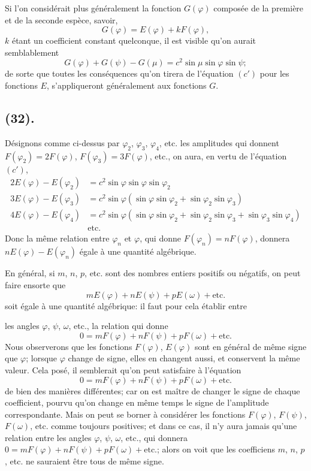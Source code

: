 \documentclass{article}
\begin{document}
Si l'on considérait plus généralement la fonction $G(\varphi)$ composée de la première et de la seconde espèce, savoir,
\[ G(\varphi)=E(\varphi)+kF(\varphi), \]
$k$ étant un coefficient constant quelconque, il est visible qu'on aurait semblablement
\[ G(\varphi)+G(\psi)-G(\mu)=c^{2}\sin\mu\sin\varphi\sin\psi; \]
de sorte que toutes les conséquences qu'on tirera de l'équation $(c')$ pour les fonctions $E$, s'appliqueront généralement aux fonctions $G$.

\subsection*{(32).}

Désignons comme ci-dessus par $\varphi_{2}$, $\varphi_{3}$, $\varphi_{4}$, etc. les amplitudes qui donnent $F(\varphi_{2})=2F(\varphi)$, $F(\varphi_{3})=3F(\varphi)$, etc., on aura, en vertu de l'équation $(c')$,
\[ \begin{aligned} 2E(\varphi)-E(\varphi_{2}) &= c^{2}\sin\varphi\sin\varphi\sin\varphi_{2} \\ 3E(\varphi)-E(\varphi_{3}) &= c^{2}\sin\varphi(\sin\varphi\sin\varphi_{2}+\sin\varphi_{2}\sin\varphi_{3}) \\ 4E(\varphi)-E(\varphi_{4}) &= c^{2}\sin\varphi(\sin\varphi\sin\varphi_{2}+\sin\varphi_{2}\sin\varphi_{3}+\sin\varphi_{3}\sin\varphi_{4}) \\ &\text{etc.} \end{aligned} \]
Donc la même relation entre $\varphi_{n}$ et $\varphi$, qui donne $F(\varphi_{n})=nF(\varphi)$, donnera $nE(\varphi)-E(\varphi_{n})$ égale à une quantité algébrique.

En général, si $m$, $n$, $p$, etc. sont des nombres entiers positifs ou négatifs, on peut faire ensorte que
\[ mE(\varphi)+nE(\psi)+pE(\omega)+\text{etc.} \]
soit égale à une quantité algébrique: il faut pour cela établir entre

les angles $\varphi$, $\psi$, $\omega$, etc., la relation qui donne
\[ 0=mF(\varphi)+nF(\psi)+pF(\omega)+\text{etc.} \]
Nous observerons que les fonctions $F(\varphi)$, $E(\varphi)$ sont en général de même signe que $\varphi$; lorsque $\varphi$ change de signe, elles en changent aussi, et conservent la même valeur. Cela posé, il semblerait qu'on peut satisfaire à l'équation
\[ 0=mF(\varphi)+nF(\psi)+pF(\omega)+\text{etc.} \]
de bien des manières différentes; car on est maître de changer le signe de chaque coefficient, pourvu qu'on change en même temps le signe de l'amplitude correspondante. Mais on peut se borner à considérer les fonctions $F(\varphi)$, $F(\psi)$, $F(\omega)$, etc. comme toujours positives; et dans ce cas, il n'y aura jamais qu'une relation entre les angles $\varphi$, $\psi$, $\omega$, etc., qui donnera $0=mF(\varphi)+nF(\psi)+pF(\omega)+\text{etc.}$; alors on voit que les coefficiens $m$, $n$, $p$, etc. ne sauraient être tous de même signe.
\end{document}
